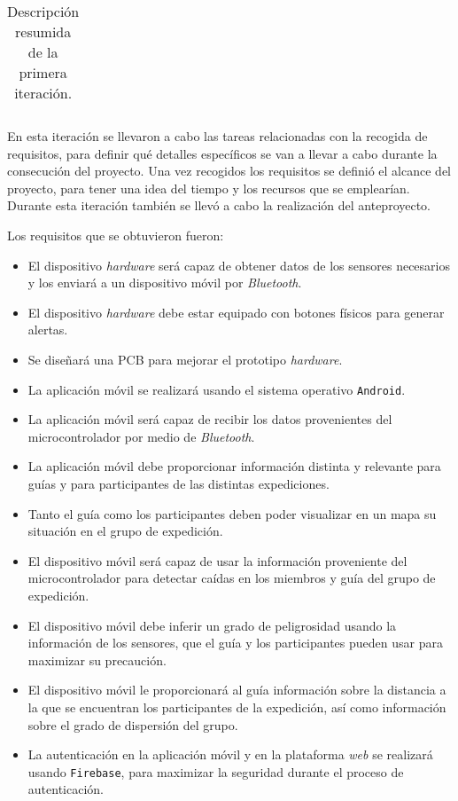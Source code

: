 \begin{table}[!h]
\begin{tabular}{|l|l|l|l|l|c|}
\end{tabular}
\caption{Descripción resumida de la primera iteración.}
\end{table}

En esta iteración se llevaron a cabo las tareas relacionadas con la recogida de requisitos, para definir qué detalles específicos se van a llevar a cabo durante la consecución del proyecto. Una vez recogidos los requisitos se definió el alcance del proyecto, para tener una idea del tiempo y los recursos que se emplearían. Durante esta iteración también se llevó a cabo la realización del anteproyecto.

Los requisitos que se obtuvieron fueron:

\begin{itemize}
\item El dispositivo \textit{hardware} será capaz de obtener datos de los sensores necesarios y los enviará a un dispositivo móvil por \textit{Bluetooth}.
\item El dispositivo \textit{hardware} debe estar equipado con botones físicos para generar alertas.
\item Se diseñará una \ac{PCB} para mejorar el prototipo \textit{hardware}.
\item La aplicación móvil se realizará usando el sistema operativo \texttt{Android}.
\item La aplicación móvil será capaz de recibir los datos provenientes del microcontrolador por medio de \textit{Bluetooth}.
\item La aplicación móvil debe proporcionar información distinta y relevante para guías y para participantes de las distintas expediciones.
\item Tanto el guía como los participantes deben poder visualizar en un mapa su situación en el grupo de expedición.
\item El dispositivo móvil será capaz de usar la información proveniente del microcontrolador para detectar caídas en los miembros y guía del grupo de expedición.
\item El dispositivo móvil debe inferir un grado de peligrosidad usando la información de los sensores, que el guía y los participantes pueden usar para maximizar su precaución.
\item El dispositivo móvil le proporcionará al guía información sobre la distancia a la que se encuentran los participantes de la expedición, así como información sobre el grado de dispersión del grupo.
\item La autenticación en la aplicación móvil y en la plataforma \textit{web} se realizará usando \texttt{Firebase}, para maximizar la seguridad durante el proceso de autenticación.

\end{itemize}
